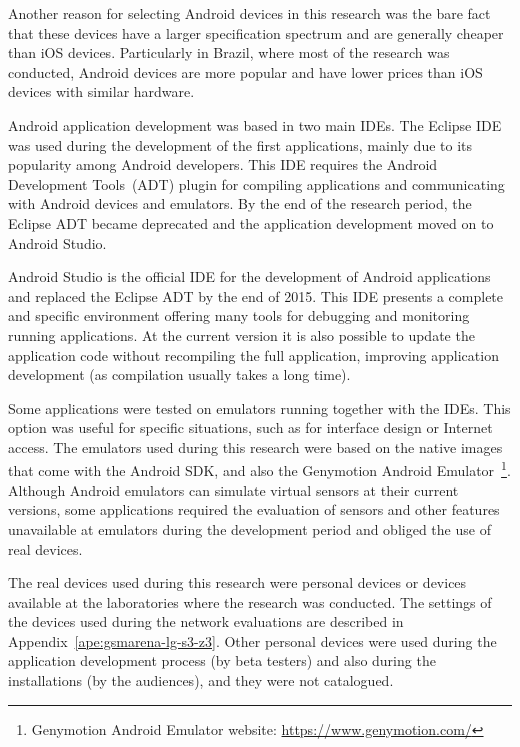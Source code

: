 Another reason for selecting Android devices in this research was the bare fact that these devices have a larger specification spectrum and are generally cheaper than iOS devices.
Particularly in Brazil, where most of the research was conducted, Android devices are more popular and have lower prices than iOS devices with similar hardware.

Android application development was based in two main IDEs.
The Eclipse IDE was used during the development of the first applications, mainly due to its popularity among Android developers.
This IDE requires the Android Development Tools~(ADT) plugin for compiling applications and communicating with Android devices and emulators.
By the end of the research period, the Eclipse ADT became deprecated and the application development moved on to Android Studio. 

Android Studio is the official IDE for the development of Android applications and replaced the Eclipse ADT by the end of 2015.
This IDE presents a complete and specific environment offering many tools for debugging and monitoring running applications.
At the current version it is also possible to update the application code without recompiling the full application, improving application development (as compilation usually takes a long time).

Some applications were tested on emulators running together with the IDEs.
This option was useful for specific situations, such as for interface design or Internet access.
The emulators used during this research were based on the native images that come with the Android SDK, and also the Genymotion Android Emulator~\footnote{Genymotion Android Emulator website: \url{https://www.genymotion.com/}}.
Although Android emulators can simulate virtual sensors at their current versions, some applications required the evaluation of sensors and other features unavailable at emulators during the development period and obliged the use of real devices.

The real devices used during this research were personal devices or devices available at the laboratories where the research was conducted.
The settings of the devices used during the network evaluations are described in Appendix~\ref{ape:gsmarena-lg-s3-z3}.
Other personal devices were used during the application development process (by beta testers) and also during the installations (by the audiences), and they were not catalogued.

